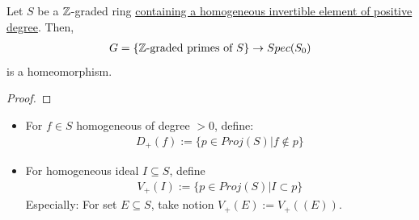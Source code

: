 \documentclass[Total.tex]{subfiles}
\begin{document}
			\begin{lemma}
				Let $S$ be a $\mathbb{Z}$-graded ring \underline{containing a homogeneous invertible element of positive degree}. Then, 
				\begin{gather*}
					G=\{\mathbb{Z}\mbox{-graded primes of }S\}\rightarrow Spec(S_0)
				\end{gather*}
				is a homeomorphism.
			\end{lemma}
			\begin{proof}
			\end{proof}
			\begin{Def}
				\begin{itemize}
					\item For $f\in S$ homogeneous of degree $>0$, define:
					\begin{gather*}
						D_+(f):=\{p\in Proj(S)|f\notin p\}
					\end{gather*}
					\item For homogeneous ideal $I\subseteq S$, define
					\begin{gather*}
						V_+(I):=\{p\in Proj(S)|I\subset p\}
					\end{gather*}
					Especially: For set $E\subseteq S$, take notion $V_+(E):=V_+((E))$.
				\end{itemize}
			\end{Def}
			
\end{document}

